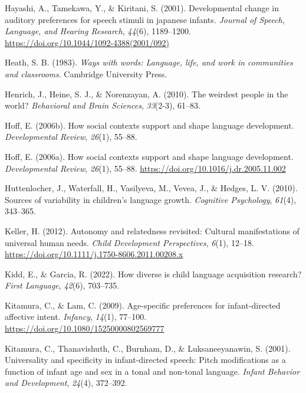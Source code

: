 \documentclass[
  english,
  ,man,floatsintext]{apa6}
\newlength{\cslhangindent}
\newenvironment{CSLReferences}[2] %
 {\begin{list}{}{%
  \setlength{\itemindent}{0pt}
  \setlength{\leftmargin}{0pt}
  \setlength{\parsep}{0pt}
  \ifodd #1
   \setlength{\leftmargin}{\cslhangindent}
   \setlength{\itemindent}{-1\cslhangindent}
  \fi
  \setlength{\itemsep}{#2\baselineskip}}}
 {\end{list}}
\begin{document}
\begin{CSLReferences}{1}{0}
Hayashi, A., Tamekawa, Y., \& Kiritani, S. (2001). Developmental change in auditory preferences for speech stimuli in japanese infants. \emph{Journal of Speech, Language, and Hearing Research}, \emph{44}(6), 1189--1200. \url{https://doi.org/10.1044/1092-4388(2001/092)}

Heath, S. B. (1983). \emph{Ways with words: Language, life, and work in communities and classrooms}. Cambridge University Press.

Henrich, J., Heine, S. J., \& Norenzayan, A. (2010). The weirdest people in the world? \emph{Behavioral and Brain Sciences}, \emph{33}(2-3), 61--83.

Hoff, E. (2006b). How social contexts support and shape language development. \emph{Developmental Review}, \emph{26}(1), 55--88.

Hoff, E. (2006a). How social contexts support and shape language development. \emph{Developmental Review}, \emph{26}(1), 55--88. \url{https://doi.org/10.1016/j.dr.2005.11.002}

Huttenlocher, J., Waterfall, H., Vasilyeva, M., Vevea, J., \& Hedges, L. V. (2010). Sources of variability in children's language growth. \emph{Cognitive Psychology}, \emph{61}(4), 343--365.

Keller, H. (2012). Autonomy and relatedness revisited: Cultural manifestations of universal human needs. \emph{Child Development Perspectives}, \emph{6}(1), 12--18. \url{https://doi.org/10.1111/j.1750-8606.2011.00208.x}

Kidd, E., \& Garcia, R. (2022). How diverse is child language acquisition research? \emph{First Language}, \emph{42}(6), 703--735.

Kitamura, C., \& Lam, C. (2009). Age-specific preferences for infant-directed affective intent. \emph{Infancy}, \emph{14}(1), 77--100. \url{https://doi.org/10.1080/15250000802569777}

Kitamura, C., Thanavishuth, C., Burnham, D., \& Luksaneeyanawin, S. (2001). Universality and specificity in infant-directed speech: Pitch modifications as a function of infant age and sex in a tonal and non-tonal language. \emph{Infant Behavior and Development}, \emph{24}(4), 372--392.


\end{CSLReferences}
\end{document}
